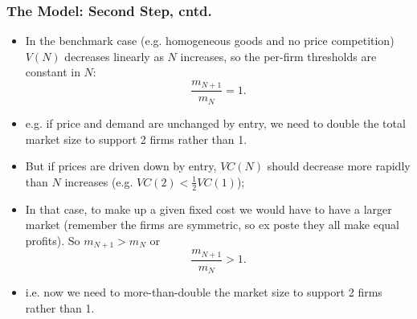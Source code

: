 \begin{frame}%

\frametitle{The Model: Second Step, cntd.}

\begin{itemize}
\item In the benchmark case (e.g. homogeneous goods and no price
competition) $V(N)$ decreases linearly as $N$ increases, so the per-firm
thresholds are constant in $N$: 
\begin{equation*}
\frac{m_{N+1}}{m_{N}}=1.
\end{equation*}

\item e.g. if price and demand are unchanged by entry, we need to double the
total market size to support 2 firms rather than 1.

\item But if prices are driven down by entry, $VC(N)$ should decrease more
rapidly than $N$ increases (e.g. $VC(2)<\frac{1}{2}VC(1)$);

\item In that case, to make up a given fixed cost we would have to have a
larger market (remember the firms are symmetric, so ex poste they all make
equal profits). So $m_{N+1}>m_{N}$ or 
\begin{equation*}
\frac{m_{N+1}}{m_{N}}>1.
\end{equation*}

\item i.e. now we need to more-than-double the market size to support 2
firms rather than 1.
\end{itemize}

\end{frame}%


